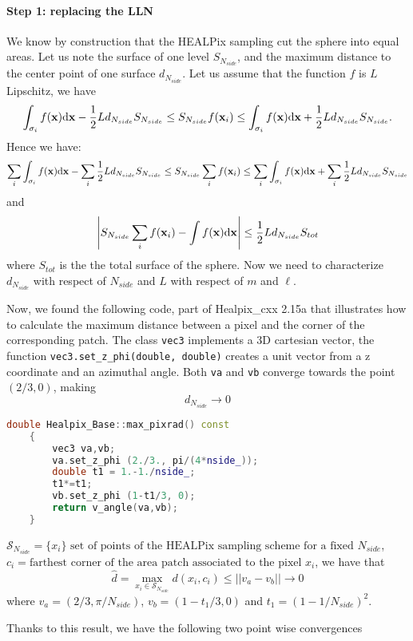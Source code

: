\paragraph{Step 1: replacing the LLN}

We know by construction that the HEALPix sampling cut the sphere into equal areas. Let us note the surface of one level $S_{N_{side}}$, and the maximum distance to the center point of one surface\textbf{ $d_{N_{side}}$}.
Let us assume that the function $f$ is $L$ Lipschitz, we have
\[
\int_{\sigma_{i}}f({\bf x})\text{d}{\bf x}-\frac{1}{2}Ld_{N_{side}}S_{N_{side}}\leq S_{N_{side}}f({\bf x}_{i})\leq\int_{\sigma_{i}}f({\bf x})\text{d}{\bf x}+\frac{1}{2}Ld_{N_{side}}S_{N_{side}}.
\]
Hence we have:
\[
\sum_{i}\int_{\sigma_{i}}f({\bf x})\text{d}{\bf x}-\sum_{i}\frac{1}{2}Ld_{N_{side}}S_{N_{side}}\leq S_{N_{side}}\sum_{i}f({\bf x}_{i})\leq\sum_{i}\int_{\sigma_{i}}f({\bf x})\text{d}{\bf x}+\sum_{i}\frac{1}{2}Ld_{N_{side}}S_{N_{side}}
\]
and 
\[
\left|S_{N_{side}}\sum_{i}f({\bf x}_{i})-\int f({\bf x})\text{d}{\bf x}\right|\le\frac{1}{2}Ld_{N_{side}}S_{tot}
\]
where $S_{tot}$ is the the total surface of the sphere. Now we need to characterize $d_{N_{side}}$ with respect of $N_{side}$ and $L$ with respect of $m$ and $\ell$. 

Now, we found the following code, part of Healpix\_cxx 2.15a \cite{Healpix_cc} that illustrates how to calculate the maximum distance between a pixel and the corner of the corresponding patch. The class \lstinline|vec3| implements a 3D cartesian vector, the function \lstinline|vec3.set_z_phi(double, double)| creates a unit vector from a z coordinate and an azimuthal angle. Both \lstinline|va| and \lstinline|vb| converge towards the point $(2/3, 0)$, making $$d_{N_{side}}\rightarrow0$$
\begin{lstlisting}[language=c++]
	double Healpix_Base::max_pixrad() const
	{
		vec3 va,vb;
		va.set_z_phi (2./3., pi/(4*nside_));
		double t1 = 1.-1./nside_;
		t1*=t1;
		vb.set_z_phi (1-t1/3, 0);
		return v_angle(va,vb);
	}
\end{lstlisting}
$\mathcal S_{N_{side}} = \{x_i\}  \text{ set of points of the HEALPix sampling scheme for a fixed }N_{side}$,\\$c_i = \text{farthest corner of the area patch associated to the pixel }x_i$, we have that 
$$\hat d=\max_{x_i\in \mathcal S_{N_{side}}}d(x_i, c_i) \leq ||v_a-v_b||\rightarrow 0$$
where $v_a = (2/3, \pi/N_{side})$, $v_b = (1-t_1/3, 0)$ and $t_1=(1-1/N_{side})^2$.

Thanks to this result, we have the following two point wise convergences

